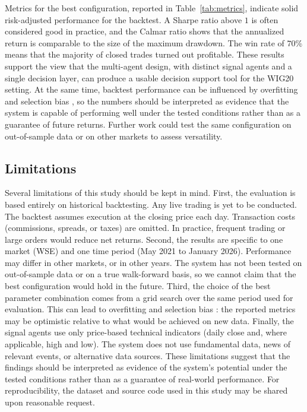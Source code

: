 \documentclass{icis}
\begin{document}
Metrics for the best configuration, reported in Table~\ref{tab:metrics}, indicate solid risk-adjusted performance for the backtest. A Sharpe ratio above $1$ is often considered good in practice, and the Calmar ratio shows that the annualized return is comparable to the size of the maximum drawdown. The win rate of $70$\% means that the majority of closed trades turned out profitable. These results support the view that the multi-agent design, with distinct signal agents and a single decision layer, can produce a usable decision support tool for the WIG20 setting. At the same time, backtest performance can be influenced by overfitting and selection bias \autocite{bailey2014}, so the numbers should be interpreted as evidence that the system is capable of performing well under the tested conditions rather than as a guarantee of future returns. Further work could test the same configuration on out-of-sample data or on other markets to assess versatility.

\subsection{Limitations}

Several limitations of this study should be kept in mind. First, the evaluation is based entirely on historical backtesting. Any live trading is yet to be conducted. The backtest assumes execution at the closing price each day. Transaction costs (commissions, spreads, or taxes) are omitted. In practice, frequent trading or large orders would reduce net returns. Second, the results are specific to one market (WSE) and one time period (May 2021 to January 2026). Performance may differ in other markets, or in other years. The system has not been tested on out-of-sample data or on a true walk-forward basis, so we cannot claim that the best configuration would hold in the future. Third, the choice of the best parameter combination comes from a grid search over the same period used for evaluation. This can lead to overfitting and selection bias \autocite{bailey2014}: the reported metrics may be optimistic relative to what would be achieved on new data. Finally, the signal agents use only price-based technical indicators (daily close and, where applicable, high and low). The system does not use fundamental data, news of relevant events, or alternative data sources. These limitations suggest that the findings should be interpreted as evidence of the system’s potential under the tested conditions rather than as a guarantee of real-world performance. For reproducibility, the dataset and source code used in this study may be shared upon reasonable request.
\end{document}
